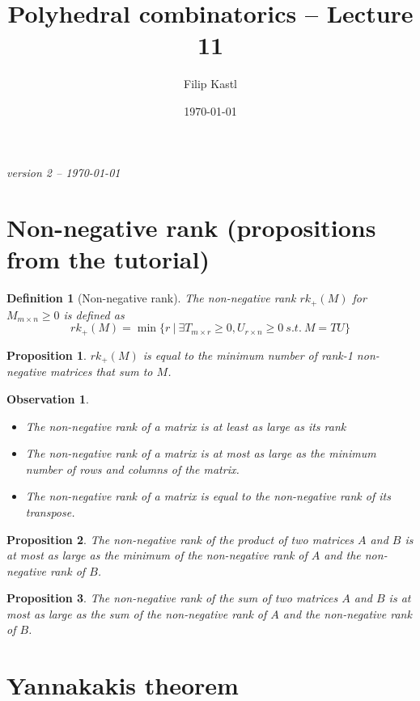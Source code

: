 \documentclass{article}
\title{Polyhedral combinatorics -- Lecture 11}
\author{Filip Kastl}
\date{\today}
\newtheorem*{definition}{Definition}
\newtheorem*{proposition}{Proposition}
\newtheorem*{observation}{Observation}
\begin{document}
\maketitle

\noindent
\emph{version 2 -- \today}

\section{Non-negative rank (propositions from the tutorial)}

\begin{definition}[Non-negative rank]
	The \emph{non-negative rank} $rk_+(M)$ for $M_{m \times n} \ge 0$ is
	defined as
	$$
	rk_+(M) = \min \{ r ~|~ \exists T_{m \times r} \ge 0, U_{r \times n}
	\ge 0 ~s.t.~ M = TU \}
	$$
\end{definition}

\begin{proposition}
	$rk_+(M)$ is equal to the minimum number of rank-1 non-negative
	matrices that sum to $M$.
\end{proposition}

\begin{observation}
	~
	\begin{itemize}
		\item The non-negative rank of a matrix is at least as large as
			its rank
		\item The non-negative rank of a matrix is at most as large as
			the minimum number of rows and columns of the matrix.
		\item The non-negative rank of a matrix is equal to the
			non-negative rank of its transpose.
	\end{itemize}
\end{observation}

\begin{proposition}
	The non-negative rank of the product of two matrices $A$ and $B$ is at
	most as large as the minimum of the non-negative rank of $A$ and the
	non-negative rank of $B$.
\end{proposition}

\begin{proposition}
	The non-negative rank of the sum of two matrices $A$ and $B$ is at most
	as large as the sum of the non-negative rank of $A$ and the
	non-negative rank of $B$.
\end{proposition}


\section{Yannakakis theorem}
\end{document}
